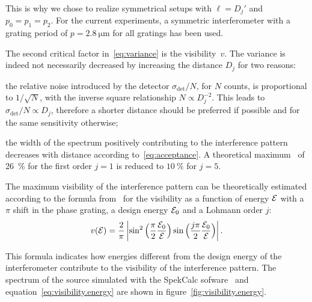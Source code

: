This is why we chose to realize symmetrical setups with $\ell = D_j'$ and
$p_0 = p_1 = p_2$. For the current experiments, a symmetric interferometer
with a grating period of $p = \SI{2.8}{\micro\metre}$ for all gratings has
been used.

The second critical factor in~\eqref{eq:variance} is the visibility~$v$. The
variance is indeed not necessarily decreased by increasing the distance
$D_j$ for two reasons:
\begin{aenumerate}
    \item the relative noise introduced by the detector
        $\sigma_{\text{det}}/N$, for
        $N$ counts, is proportional to $1 / \sqrt{N}$, with the inverse
        square relationship $N \propto
        D_j^{-2}$. This leads to $\sigma_{\text{det}}/N \propto D_j$,
        therefore a shorter distance should be preferred if possible and for
        the same sensitivity otherwise;
    \item the width of the spectrum positively contributing to the
        interference pattern decreases with distance according
        to~\eqref{eq:acceptance}. A theoretical
        maximum~\parencite{Thuering20130027} of
        \SI{26}{\percent} for the first order $j = 1$ is reduced to
        $\SI{10}{\percent}$ for $j = 5$.
\end{aenumerate}
The maximum visibility of the interference pattern can be theoretically
estimated according to the formula from~\cite{Thuering20130027} for the visibility as a function
of energy $\mathcal{E}$ with a $\pi$ shift in the phase grating, a design energy
$\mathcal{E}_0$ and a Lohmann order $j$:
\begin{equation}
            v(\mathcal{E}) = \frac{2}{\pi} \left\lvert \sin^2
            \Big(\frac{\pi}{2}\frac{\mathcal{E}_0}{\mathcal{E}}\Big) 
            \sin
            \Big(\frac{j\pi}{2}\frac{\mathcal{E}_0}{\mathcal{E}}\Big) 
            \right\rvert.
    \label{eq:visibility.energy}
\end{equation}

This formula indicates how energies different from the design energy of the
interferometer contribute to the visibility of the interference pattern. The
spectrum of the source simulated with the SpekCalc sofware~\parencite{spekcalc}
and equation~\eqref{eq:visibility.energy} are shown in
figure~\ref{fig:visibility.energy}.


